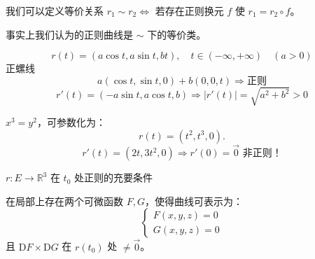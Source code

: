 \documentclass[lang=cn,10pt,thmcnt=section]{elegantbook}
\begin{document}
\begin{remark}
    我们可以定义等价关系 $r_1 \sim r_2 \Leftrightarrow$ 若存在正则换元 $f$ 使 $r_1 = r_2 \circ f$。

事实上我们认为的正则曲线是 $\sim$ 下的等价类。


\end{remark}

\begin{example}
\[
r(t) = (a\cos t, a\sin t, bt), \quad t \in (-\infty, +\infty) \quad (a > 0)
\]
正螺线
\[
a(\cos t, \sin t, 0) + b(0, 0, t) \Rightarrow \text{正则}
\]
\[
r'(t) = (-a\sin t, a\cos t, b) \Rightarrow |r'(t)| = \sqrt{a^2 + b^2} > 0
\]
\end{example}

\begin{example}
    $x^3 = y^2$，可参数化为：
\[
r(t) = (t^2, t^3, 0).
\]
\[
r'(t) = (2t, 3t^2, 0) \Rightarrow r'(0) = \vec{0} \text{ 非正则！}
\]
\end{example}
\begin{theorem}
    $r: E \rightarrow \mathbb{R}^3$ 在 $t_0$ 处正则的充要条件

在局部上存在两个可微函数 $F, G$，使得曲线可表示为：
\[
\begin{cases}
F(x, y, z) = 0 \\
G(x, y, z) = 0
\end{cases}
\]
且 $\text{D}F \times \text{D}G$ 在 $r(t_0)$ 处 $\neq \vec{0}$。
\end{theorem}
\end{document}
